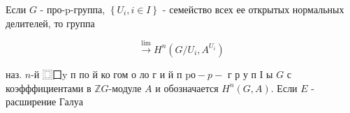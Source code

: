 \documentclass[10pt]{article}
\begin{document}
Если $G$ - про-p-группа, $\left\{U_{i}, i \in I\right\}$ - семейство всех ее открытых нормальных делителей, то группа



\[

\stackrel{\lim }{\longrightarrow} H^{n}\left(G / U_{i}, A^{U_{i}}\right)

\]



наз. $n$-й $\mathbf{⿴ 囗} \mathrm{y}$ п по й ко гом о ло г и й п $\mathrm{p} о-p-$ г р у п І ы $G$ с коэфффициентами в $\mathbb{Z} G$-модуле $A$ и обозначается $H^{n}(G, A)$. Если $E$ - расширение Галуа
\end{document}
